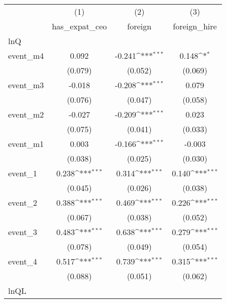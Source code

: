 {
\def\sym#1{\ifmmode^{#1}\else\(^{#1}\)\fi}
\begin{tabular}{l*{3}{c}}
\hline\hline
            &\multicolumn{1}{c}{(1)}&\multicolumn{1}{c}{(2)}&\multicolumn{1}{c}{(3)}\\
            &\multicolumn{1}{c}{has\_expat\_ceo}&\multicolumn{1}{c}{foreign}&\multicolumn{1}{c}{foreign\_hire}\\
\hline
lnQ         &                     &                     &                     \\
event\_m4    &       0.092         &      -0.241\sym{***}&       0.148\sym{*}  \\
            &     (0.079)         &     (0.052)         &     (0.069)         \\
[1em]
event\_m3    &      -0.018         &      -0.208\sym{***}&       0.079         \\
            &     (0.076)         &     (0.047)         &     (0.058)         \\
[1em]
event\_m2    &      -0.027         &      -0.209\sym{***}&       0.023         \\
            &     (0.075)         &     (0.041)         &     (0.033)         \\
[1em]
event\_m1    &       0.003         &      -0.166\sym{***}&      -0.003         \\
            &     (0.038)         &     (0.025)         &     (0.030)         \\
[1em]
event\_1     &       0.238\sym{***}&       0.314\sym{***}&       0.140\sym{***}\\
            &     (0.045)         &     (0.026)         &     (0.038)         \\
[1em]
event\_2     &       0.388\sym{***}&       0.469\sym{***}&       0.226\sym{***}\\
            &     (0.067)         &     (0.038)         &     (0.052)         \\
[1em]
event\_3     &       0.483\sym{***}&       0.638\sym{***}&       0.279\sym{***}\\
            &     (0.078)         &     (0.049)         &     (0.054)         \\
[1em]
event\_4     &       0.517\sym{***}&       0.739\sym{***}&       0.315\sym{***}\\
            &     (0.088)         &     (0.051)         &     (0.062)         \\
\hline
lnQL        &                     &                     &                     \\

\end{tabular}}
